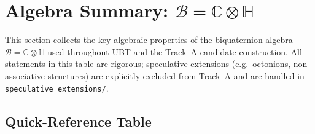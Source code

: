 %
%


\section{Algebra Summary: $\mathcal{B} = \mathbb{C}\otimes\mathbb{H}$}
\label{sec:algebra:summary_table}

This section collects the key algebraic properties of the biquaternion algebra
$\mathcal{B} = \mathbb{C}\otimes\mathbb{H}$ used throughout UBT and the Track~A
candidate construction.  All statements in this table are rigorous; speculative
extensions (e.g.\ octonions, non-associative structures) are explicitly excluded
from Track~A and are handled in
\texttt{speculative\_extensions/}.

\subsection{Quick-Reference Table}

